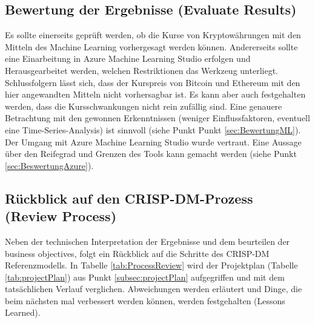 \subsection{Bewertung der Ergebnisse (Evaluate Results)} \label{subsec:revRes}
Es sollte einerseits geprüft werden, ob die Kurse von Kryptowährungen mit den Mitteln des Machine Learning vorhergesagt werden können. Andererseits sollte eine Einarbeitung in Azure Machine Learning Studio erfolgen und Herausgearbeitet werden, welchen Restriktionen das Werkzeug unterliegt.
Schlussfolgern lässt sich, dass der Kurspreis von Bitcoin und Ethereum mit den hier angewandten Mitteln nicht vorhersagbar ist. Es kann aber auch festgehalten werden, dass die Kursschwankungen nicht rein zufällig sind. Eine genauere Betrachtung mit den gewonnen Erkenntnissen (weniger Einflussfaktoren, eventuell eine Time-Series-Analysis) ist sinnvoll (siehe Punkt Punkt \ref{sec:BewertungML}).
Der Umgang mit Azure Machine Learning Studio wurde vertraut. Eine Aussage über den Reifegrad und Grenzen des Tools kann gemacht werden (siehe Punkt \ref{sec:BeswertungAzure}).

\subsection{Rückblick auf den CRISP-DM-Prozess (Review Process)}
Neben der technischen Interpretation der Ergebnisse und dem beurteilen der business objectives, folgt ein Rückblick auf die Schritte des CRISP-DM Referenzmodells.
In Tabelle \ref{tab:ProcessReview} wird der Projektplan (Tabelle \ref{tab:projectPlan}) aus Punkt \ref{subsec:projectPlan} aufgegriffen und mit dem tatsächlichen Verlauf verglichen. Abweichungen werden erläutert und Dinge, die beim nächsten mal verbessert werden können, werden festgehalten (Lessons Learned).

